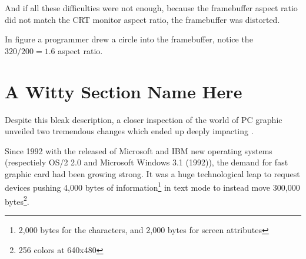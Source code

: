 \par
{}
\par
And if all these difficulties were not enough, because the framebuffer aspect ratio did not match the CRT monitor aspect ratio, the framebuffer was distorted.\\
\par
\par
{}
\par
In figure \label{circleframebuffer} a programmer drew a circle into the framebuffer, notice the $ 320/200 = 1.6 $ aspect ratio.
\par
{}
\par







\section{A Witty Section Name Here}
Despite this bleak description, a closer inspection of the world of PC graphic unveiled two tremendous changes which ended up deeply impacting \doom. \\
\par
Since 1992 with the released of Microsoft and IBM new operating systems (respectiely OS/2 2.0 and Microsoft Windows 3.1 (1992)), the demand for fast graphic card had been growing strong. It was a huge technological leap to request devices pushing 4,000 bytes of information\footnote{2,000 bytes for the characters, and 2,000 bytes for screen attributes} in text mode to instead move 300,000 bytes\footnote{256 colors at 640x480}.\\
\par




